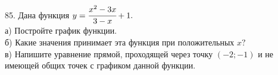 85. Дана функция $y=\cfrac{x^2-3x}{3-x}+1.$\\
а) Постройте график функции.\\
б) Какие значения принимает эта функция при положительных $x?$\\
в) Напишите уравнение прямой, проходящей через точку $(-2;-1)$ и не имеющей общих точек с графиком данной функции.\\

